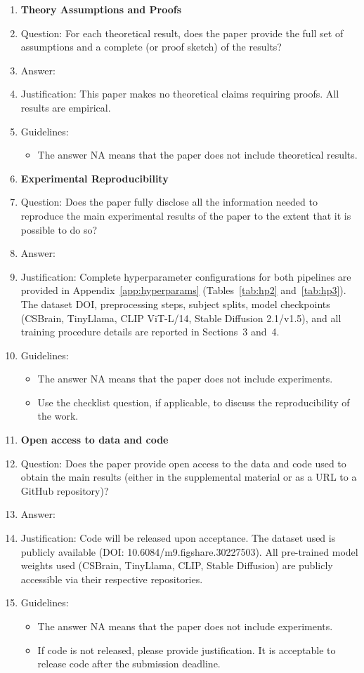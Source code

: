 \documentclass{article}
\begin{document}
\begin{enumerate}
\item {\bf Theory Assumptions and Proofs}
    \item[] Question: For each theoretical result, does the paper provide the full set of assumptions and a complete (or proof sketch) of the results?
    \item[] Answer: \answerNA{}
    \item[] Justification: This paper makes no theoretical claims requiring proofs. All results are empirical.
    \item[] Guidelines:
    \begin{itemize}
        \item The answer NA means that the paper does not include theoretical results.
    \end{itemize}

\item {\bf Experimental Reproducibility}
    \item[] Question: Does the paper fully disclose all the information needed to reproduce the main experimental results of the paper to the extent that it is possible to do so?
    \item[] Answer: \answerYes{}
    \item[] Justification: Complete hyperparameter configurations for both pipelines are provided in Appendix~\ref{app:hyperparams} (Tables~\ref{tab:hp2} and~\ref{tab:hp3}). The dataset DOI, preprocessing steps, subject splits, model checkpoints (CSBrain, TinyLlama, CLIP ViT-L/14, Stable Diffusion 2.1/v1.5), and all training procedure details are reported in Sections~3 and~4.
    \item[] Guidelines:
    \begin{itemize}
        \item The answer NA means that the paper does not include experiments.
        \item Use the checklist question, if applicable, to discuss the reproducibility of the work.
    \end{itemize}

\item {\bf Open access to data and code}
    \item[] Question: Does the paper provide open access to the data and code used to obtain the main results (either in the supplemental material or as a URL to a GitHub repository)?
    \item[] Answer: \answerNo{}
    \item[] Justification: Code will be released upon acceptance. The dataset used is publicly available (DOI: 10.6084/m9.figshare.30227503). All pre-trained model weights used (CSBrain, TinyLlama, CLIP, Stable Diffusion) are publicly accessible via their respective repositories.
    \item[] Guidelines:
    \begin{itemize}
        \item The answer NA means that the paper does not include experiments.
        \item If code is not released, please provide justification. It is acceptable to release code after the submission deadline.
    \end{itemize}


\end{enumerate}
\end{document}
